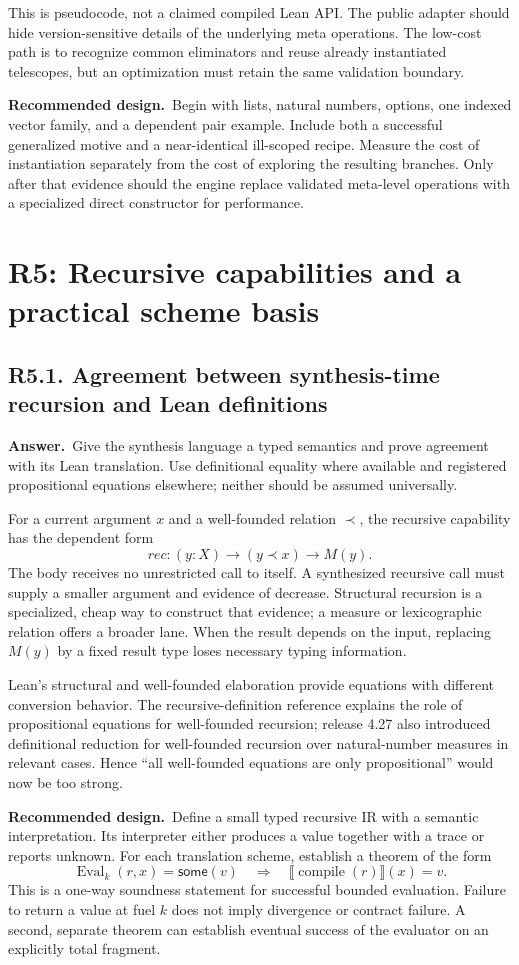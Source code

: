 \documentclass[11pt,a4paper]{article}
\newcommand{\qid}[3]{\subsection{#2. #3}\label{#1}}
\newcommand{\answer}{\noindent\textbf{Answer.}\ }
\newcommand{\proposal}{\noindent\textbf{Recommended design.}\ }
\newcommand{\Eval}{\operatorname{Eval}}
\theoremstyle{remark}
\begin{document}
This is pseudocode, not a claimed compiled Lean API. The public adapter should hide version-sensitive details of the underlying meta operations. The low-cost path is to recognize common eliminators and reuse already instantiated telescopes, but an optimization must retain the same validation boundary.

\proposal Begin with lists, natural numbers, options, one indexed vector family, and a dependent pair example. Include both a successful generalized motive and a near-identical ill-scoped recipe. Measure the cost of instantiation separately from the cost of exploring the resulting branches. Only after that evidence should the engine replace validated meta-level operations with a specialized direct constructor for performance.

\section{R5: Recursive capabilities and a practical scheme basis}\label{sec:r5}

\qid{q51}{R5.1}{Agreement between synthesis-time recursion and Lean definitions}
\answer Give the synthesis language a typed semantics and prove agreement with its Lean translation. Use definitional equality where available and registered propositional equations elsewhere; neither should be assumed universally.

For a current argument $x$ and a well-founded relation $\prec$, the recursive capability has the dependent form
\[
 \mathit{rec}:(y:X)\to(y\prec x)\to M(y).
\]
The body receives no unrestricted call to itself. A synthesized recursive call must supply a smaller argument and evidence of decrease. Structural recursion is a specialized, cheap way to construct that evidence; a measure or lexicographic relation offers a broader lane. When the result depends on the input, replacing $M(y)$ by a fixed result type loses necessary typing information.

Lean's structural and well-founded elaboration provide equations with different conversion behavior. The recursive-definition reference explains the role of propositional equations for well-founded recursion; release 4.27 also introduced definitional reduction for well-founded recursion over natural-number measures in relevant cases. Hence ``all well-founded equations are only propositional'' would now be too strong.~\cite{leanrec,lean427}

\proposal Define a small typed recursive IR with a semantic interpretation. Its interpreter either produces a value together with a trace or reports unknown. For each translation scheme, establish a theorem of the form
\[
 \Eval_k(r,x)=\mathsf{some}(v)
 \quad\Longrightarrow\quad
 \llbracket\operatorname{compile}(r)\rrbracket(x)=v.
\]
This is a one-way soundness statement for successful bounded evaluation. Failure to return a value at fuel $k$ does not imply divergence or contract failure. A second, separate theorem can establish eventual success of the evaluator on an explicitly total fragment.
\end{document}
